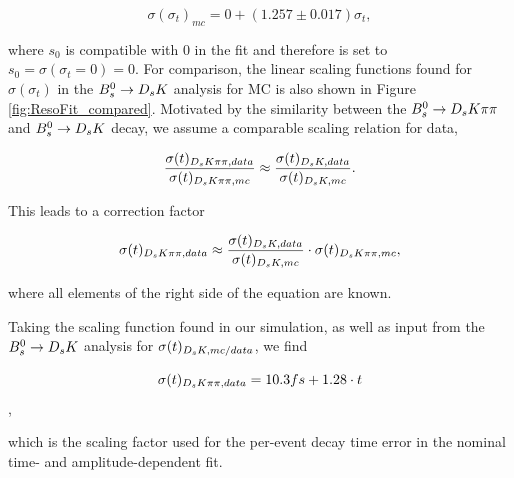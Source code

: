 \begin{equation}
\sigma(\sigma_{t})_{mc} = 0 + (1.257 \pm 0.017) \sigma_{t},
\label{eq:resfitres}
\end{equation}

where $s_{0}$ is compatible with 0 in the fit and therefore is set to $s_{0} = \sigma(\sigma_{t} = 0) = 0$. 
For comparison, the linear scaling functions found for $\sigma(\sigma_{t})$ in the ${{B}^0_{s}}\rightarrow{\ensuremath{{D}_{s}}}{\ensuremath{K}}$ analysis \cite{Aaij:2017lff} for MC is also shown in Figure \ref{fig:ResoFit_compared}.  
Motivated by the similarity between the ${{B}^0_{s}}\rightarrow{\ensuremath{{D}_{s}}}{\ensuremath{K}}{\ensuremath{\pi}}{\ensuremath{\pi}}$ and ${{B}^0_{s}}\rightarrow{\ensuremath{{D}_{s}}}{\ensuremath{K}}$ decay, we assume a comparable scaling relation for data, 

\begin{equation}
\frac{\sigma(t)_{{{D}_{s}}{K}{\pi}{\pi},data}}{\sigma(t)_{{{D}_{s}}{K}{\pi}{\pi},mc}} \approx  \frac{\sigma(t)_{{{D}_{s}}{K},data}}{\sigma(t)_{{{D}_{s}}{K},mc}}.
\label{eq:resoMCvsData}
\end{equation}

This leads to a correction factor 

\begin{equation}
\sigma(t)_{{{D}_{s}}{K}{\pi}{\pi},data} \approx  \frac{\sigma(t)_{{{D}_{s}}{K},data}}{\sigma(t)_{{{D}_{s}}{K},mc}} \cdot \sigma(t)_{{{D}_{s}}{K}{\pi}{\pi},mc},
\label{eq:resoMCvsData_2}
\end{equation}

where all elements of the right side of the equation are known. \newline

Taking the scaling function found in our simulation, as well as input from the ${{B}^0_{s}}\rightarrow{\ensuremath{{D}_{s}}}{\ensuremath{K}}$ analysis for $\sigma(t)_{{{D}_{s}}{K},mc/data}$, we find

\[\sigma(t)_{{{D}_{s}}{K}{\pi}{\pi},data} = 10.3 fs + 1.28 \cdot t\],

which is the scaling factor used for the per-event decay time error in the nominal time- and amplitude-dependent fit. 


